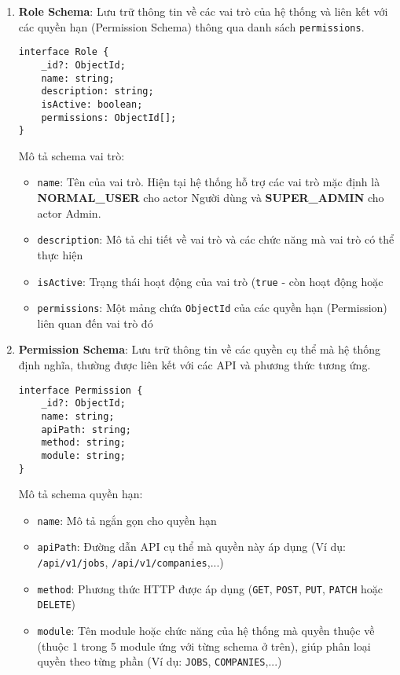 \begin{enumerate}
    \vspace{1mm}
    \item \textbf{Role Schema}: Lưu trữ thông tin về các vai trò của hệ thống và liên kết với các quyền hạn (Permission Schema) thông qua danh sách \texttt{permissions}.
    \begin{lstlisting}[style=ES6, numbers=none]
interface Role {
    _id?: ObjectId;
    name: string;
    description: string;
    isActive: boolean;
    permissions: ObjectId[];
}
    \end{lstlisting}
    Mô tả schema vai trò:
    \begin{itemize}
        \item \texttt{name}: Tên của vai trò. Hiện tại hệ thống hỗ trợ các vai trò mặc định là \textbf{NORMAL\_USER} cho actor Người dùng và \textbf{SUPER\_ADMIN} cho actor Admin.
        \item \texttt{description}: Mô tả chi tiết về vai trò và các chức năng mà vai trò có thể thực hiện
        \item \texttt{isActive}: Trạng thái hoạt động của vai trò (\texttt{true} - còn hoạt động hoặc \texttt{}
        \item \texttt{permissions}: Một mảng chứa \texttt{ObjectId} của các quyền hạn (Permission) liên quan đến vai trò đó
    \end{itemize}

    \vspace{2mm}
    \item \textbf{Permission Schema}: Lưu trữ thông tin về các quyền cụ thể mà hệ thống định nghĩa, thường được liên kết với các API và phương thức tương ứng.
    \begin{lstlisting}[numbers=none]
interface Permission {
    _id?: ObjectId;
    name: string;
    apiPath: string;
    method: string;
    module: string;
}
    \end{lstlisting}
    Mô tả schema quyền hạn:
    \begin{itemize}
        \item \texttt{name}: Mô tả ngắn gọn cho quyền hạn
        \item \texttt{apiPath}: Đường dẫn API cụ thể mà quyền này áp dụng (Ví dụ: \texttt{/api/v1/jobs}, \texttt{/api/v1/companies},...)
        \item \texttt{method}: Phương thức HTTP được áp dụng (\texttt{GET}, \texttt{POST}, \texttt{PUT}, \texttt{PATCH} hoặc \texttt{DELETE})
        \item \texttt{module}: Tên module hoặc chức năng của hệ thống mà quyền thuộc về (thuộc 1 trong 5 module ứng với từng schema ở trên), giúp phân loại quyền theo từng phần (Ví dụ: \texttt{JOBS}, \texttt{COMPANIES},...)
    \end{itemize}
\end{enumerate}
